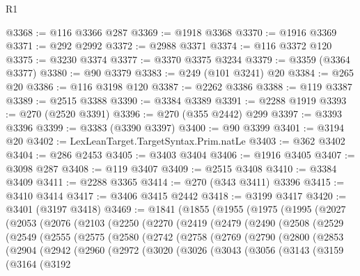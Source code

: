 \begin{lexlean}{R1}
\begin{coremodule}
@3368 := @116 @3366 @287
@3369 := @1918 @3368
@3370 := @1916 @3369
@3371 := @292 @2992
@3372 := @2988 @3371
@3374 := @116 @3372 @120
@3375 := @3230 @3374
@3377 := @3370 @3375 @3234
@3379 := @3359 (@3364 @3377)
@3380 := @90 @3379
@3383 := @249 (@101 @3241) @20
@3384 := @265 @20
@3386 := @116 @3198 @120
@3387 := @2262 @3386
@3388 := @119 @3387
@3389 := @2515 @3388
@3390 := @3384 @3389
@3391 := @2288 @1919
@3393 := @270 (@2520 @3391)
@3396 := @270 (@355 @2442) @299
@3397 := @3393 @3396
@3399 := @3383 (@3390 @3397)
@3400 := @90 @3399
@3401 := @3194 @20
@3402 := LexLeanTarget.TargetSyntax.Prim.natLe
@3403 := @362 @3402
@3404 := @286 @2453
@3405 := @3403 @3404
@3406 := @1916 @3405
@3407 := @3098 @287
@3408 := @119 @3407
@3409 := @2515 @3408
@3410 := @3384 @3409
@3411 := @2288 @3365
@3414 := @270 (@343 @3411) @3396
@3415 := @3410 @3414
@3417 := @3406 @3415 @2442
@3418 := @3199 @3417
@3420 := @3401 (@3197 @3418)
@3469 := @1841
    (@1855
      (@1955
        (@1975
          (@1995
            (@2027
              (@2053
                (@2076
                  (@2103
                    (@2250
                      (@2270
                        (@2419
                          (@2479
                            (@2490
                              (@2508
                                (@2529
                                  (@2549
                                    (@2555
                                      (@2575
                                        (@2580
                                          (@2742
                                            (@2758
                                              (@2769
                                                (@2790
                                                  (@2800
                                                    (@2853
                                                      (@2904
                                                        (@2942
                                                          (@2960
                                                            (@2972
                                                              (@3020
                                                                (@3026
                                                                  (@3043
                                                                    (@3056
                                                                      (@3143
                                                                        (@3159
                                                                          (@3164
                                                                            (@3192

\end{coremodule}
\end{lexlean}
